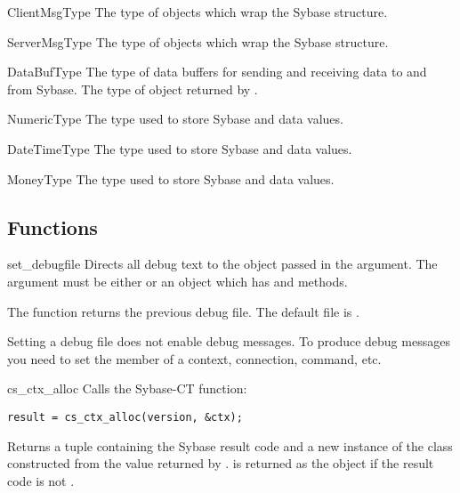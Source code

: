 \begin{datadesc}{ClientMsgType}
The type of  objects which wrap the Sybase
 structure.
\end{datadesc}

\begin{datadesc}{ServerMsgType}
The type of  objects which wrap the Sybase
 structure.
\end{datadesc}

\begin{datadesc}{DataBufType}
The type of data buffers for sending and receiving data to and from
Sybase.  The type of object returned by .
\end{datadesc}

\begin{datadesc}{NumericType}
The type used to store Sybase  and 
data values.
\end{datadesc}

\begin{datadesc}{DateTimeType}
The type used to store Sybase  and
 data values.
\end{datadesc}

\begin{datadesc}{MoneyType}
The type used to store Sybase  and 
data values.
\end{datadesc}

\subsection{Functions}

\begin{funcdesc}{set_debug}{file}
Directs all debug text to the object passed in the 
argument.  The  argument must be either  or an
object which has  and  methods.

The function returns the previous debug file.  The default file is
.

Setting a debug file does not enable debug messages.  To produce debug
messages you need to set the  member of a context,
connection, command, etc.
\end{funcdesc}

\begin{funcdesc}{cs_ctx_alloc}{}
Calls the Sybase-CT  function:

\begin{verbatim}
result = cs_ctx_alloc(version, &ctx);
\end{verbatim}

Returns a tuple containing the Sybase result code and a new instance
of the  class constructed from the  value
returned by .   is returned as the
 object if the result code is not .
\end{funcdesc}

